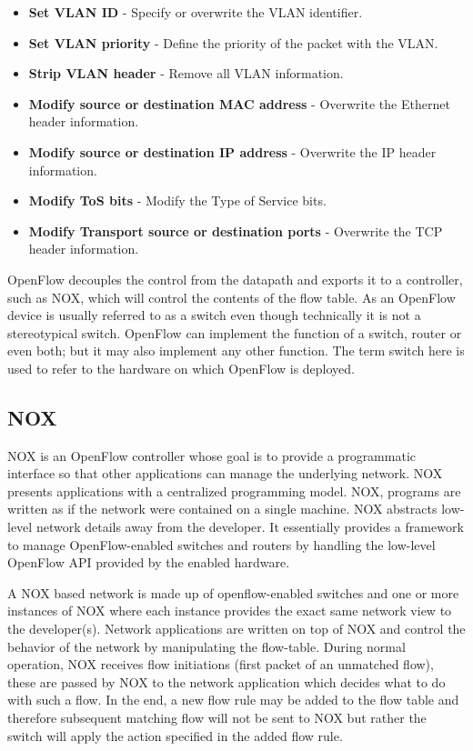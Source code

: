 \begin{itemize}
\item \textbf{Set VLAN ID} - Specify or overwrite the VLAN identifier.
\item \textbf{Set VLAN priority} - Define the priority of the packet with the VLAN.
\item \textbf{Strip VLAN header} - Remove all VLAN information.
\item \textbf{Modify source or destination MAC address} - Overwrite the Ethernet header information. 
\item \textbf{Modify source or destination IP address} - Overwrite the IP header information.
\item \textbf{Modify ToS bits} - Modify the Type of Service bits.
\item \textbf{Modify Transport source or destination ports} - Overwrite the TCP header information.
\end{itemize}

OpenFlow decouples the control from the datapath and exports it to a
controller, such as NOX, which will control the contents of the flow table. As an OpenFlow device is usually referred to as a switch even though technically it is not a stereotypical switch. OpenFlow can implement the function of a switch, router or even both; but it may also implement any other function. The term switch here is used to refer to the hardware on which OpenFlow is deployed.

\subsection{NOX}

NOX \cite{NOX} is an OpenFlow controller whose goal is to provide a programmatic
interface so that other applications can manage the underlying network. NOX
presents applications with a centralized programming model. NOX, programs are
written as if the network were contained on a single machine. NOX abstracts
low-level network details away from the developer. It essentially provides a
framework to manage OpenFlow-enabled switches and routers by handling the
low-level OpenFlow API provided by the enabled hardware.
 
A NOX based network is made up of openflow-enabled switches and one or more
instances of NOX where each instance provides the exact same network view to
the developer(s). Network applications are written on top of NOX and control
the behavior of the network by manipulating the flow-table. During normal
operation, NOX receives flow initiations (first packet of an unmatched flow),
these are passed by NOX to the network application which decides what to do
with such a flow. In the end, a new flow rule may be added to the flow table
and therefore subsequent matching flow will not be sent to NOX but rather the switch will apply the action specified in the added flow rule.

